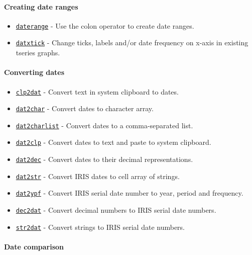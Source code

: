  \paragraph{Creating date ranges}
 
 \begin{itemize}
 \item
   \href{dates/daterange}{\texttt{daterange}} - Use the colon operator to
   create date ranges.
 \item
   \href{dates/datxtick}{\texttt{datxtick}} - Change ticks, labels and/or
   date frequency on x-axis in existing tseries graphs.
 \end{itemize}
 
 \paragraph{Converting dates}
 
 \begin{itemize}
 \item
   \href{dates/clp2dat}{\texttt{clp2dat}} - Convert text in system
   clipboard to dates.
 \item
   \href{dates/dat2char}{\texttt{dat2char}} - Convert dates to character
   array.
 \item
   \href{dates/dat2charlist}{\texttt{dat2charlist}} - Convert dates to a
   comma-separated list.
 \item
   \href{dates/dat2clp}{\texttt{dat2clp}} - Convert dates to text and
   paste to system clipboard.
 \item
   \href{dates/dat2dec}{\texttt{dat2dec}} - Convert dates to their
   decimal representations.
 \item
   \href{dates/dat2str}{\texttt{dat2str}} - Convert IRIS dates to cell
   array of strings.
 \item
   \href{dates/dat2ypf}{\texttt{dat2ypf}} - Convert IRIS serial date
   number to year, period and frequency.
 \item
   \href{dates/dec2dat}{\texttt{dec2dat}} - Convert decimal numbers to
   IRIS serial date numbers.
 \item
   \href{dates/str2dat}{\texttt{str2dat}} - Convert strings to IRIS
   serial date numbers.
 \end{itemize}
 
 \paragraph{Date comparison}
 
